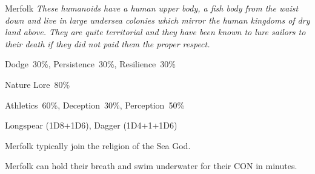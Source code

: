 \begin{monsterbox}{Merfolk}
	\textit{These humanoids have a human upper body, a fish body from the waist down and live in large undersea colonies which mirror the human kingdoms of dry land above. They are quite territorial and they have been known to lure sailors to their death if they did not paid them the proper respect.}\\
	\rpghline
	\basics[%
        hitpoints  = 14,
	majorwound = 7,
	damagemodifier = +1D6,
	powerpoints = 11,
	movementrate = {23m swimming, 7m crawling in land},
	armor = None,
	plunderrating = 1
	]
	\rpghline%
	\stats[ %
		STR = 3D6+3 (14),
		CON = 3D6   (11),
		DEX = 2D6+6 (13),
		SIZ = 3D6+6 (17),
		INT = 3D6   (11),
		POW = 3D6   (11),
		CHA = 3D6   (11)
	]
	\rpghline%
	\begin{rpg-monsteraction}[Resistances]
		Dodge~30\%, Persistence~30\%, Resilience~30\%
	\end{rpg-monsteraction}
	\begin{rpg-monsteraction}[Knowledge]
		Nature Lore~80\%
	\end{rpg-monsteraction}
	\begin{rpg-monsteraction}[Practical]
		Athletics~60\%, Deception~30\%, Perception~50\%
	\end{rpg-monsteraction}
	\begin{rpg-monsteraction}
		Longspear (1D8+1D6), Dagger (1D4+1+1D6)
	\end{rpg-monsteraction}
	\begin{rpg-monsteraction}[Magic]
		Merfolk typically join the religion of the Sea God.
	\end{rpg-monsteraction}
	\begin{rpg-monsteraction}
		Merfolk can hold their breath and swim underwater for their CON in minutes.
	\end{rpg-monsteraction}

\end{monsterbox}


